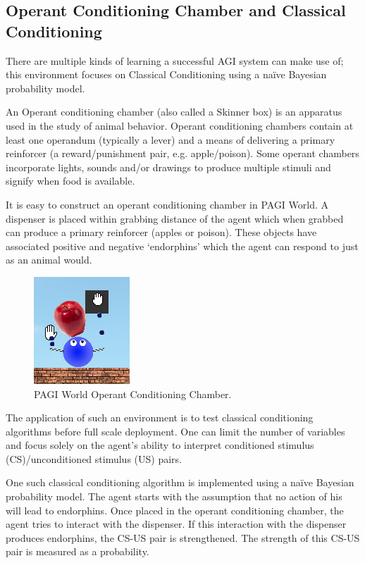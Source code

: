 \subsection{Operant Conditioning Chamber and Classical Conditioning}

There are multiple kinds of learning a successful AGI system can make use of; this environment focuses on Classical Conditioning using a na\"{i}ve Bayesian probability model.

An Operant conditioning chamber (also called a Skinner box) is an apparatus used in the study of animal behavior. %
Operant conditioning chambers contain at least one operandum (typically a lever) and a means of delivering a primary reinforcer (a reward/punishment pair, e.g. apple/poison). Some operant chambers incorporate lights, sounds and/or drawings to produce multiple stimuli and signify when food is available.

It is easy to construct an operant conditioning chamber in PAGI World. A dispenser is placed within grabbing distance of the agent which when grabbed can produce a primary reinforcer (apples or poison).  These objects have associated positive and negative `endorphins' which the agent can respond to just as an animal would. 


\begin{figure}[h]
\centering
\includegraphics{dispenser}
\caption{PAGI World Operant Conditioning Chamber.} %
\end{figure}


The application of such an environment is to test classical conditioning algorithms before full scale deployment.  One can limit the number of variables and focus solely on the agent's ability to interpret conditioned stimulus (CS)/unconditioned stimulus (US) pairs.

One such classical conditioning algorithm is implemented using a na\"{i}ve Bayesian probability model. %
 The agent starts with the assumption that no action of his will lead to endorphins.  Once placed in the operant conditioning chamber, the agent tries to interact with the dispenser.  If this interaction with the dispenser produces endorphins, the CS-US pair is strengthened.  The strength of this CS-US pair is measured as a probability.

